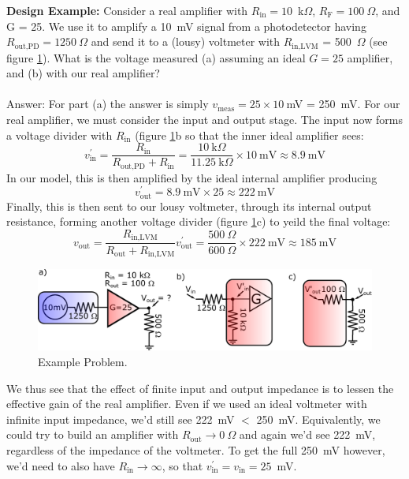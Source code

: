 \documentclass[]{article}
\begin{document}
\noindent\textbf{Design Example:} Consider a real amplifier with $R_\text{in} = 10$~k$\Omega$, $R_\text{F} = 100~\Omega$, and G = 25. We use it to amplify a 10~mV signal from a photodetector having $R_\text{out,PD} = 1250~\Omega$ and send it to a (lousy) voltmeter with $R_\text{in,LVM}$ = 500~$\Omega$ (see figure \ref{fig:prob_amp}). What is the voltage measured (a) assuming an ideal $G = 25$ amplifier, and (b) with our real amplifier?\\\\\noindent Answer: For part (a) the answer is simply $v_\text{meas} = 25\times10~$mV = 250~mV. For our real amplifier, we must consider the input and output stage. The input now forms a voltage divider with $R_\text{in}$ (figure \ref{fig:prob_amp}b so that the inner ideal amplifier sees:
$$
v_\text{in}^\prime=\frac{R_\text{in}}{R_\text{out,PD} + R_\text{in}} = \frac{10~\text{k}\Omega}{11.25~\text{k}\Omega}\times10~\text{mV} \approx 8.9~\text{mV}
$$
In our model, this is then amplified by the ideal internal amplifier producing
$$
v_\text{out}^\prime = 8.9~\text{mV}\times 25 \approx 222~\text{mV}
$$
Finally, this is then sent to our lousy voltmeter, through its internal output resistance, forming another voltage divider (figure \ref{fig:prob_amp}c) to yeild the final voltage:
$$
v_\text{out} = \frac{R_\text{in,LVM}}{R_\text{out} + R_\text{in,LVM}}v_\text{out}^\prime = \frac{500~\Omega}{600~\Omega}\times 222~\text{mV}\approx 185~\text{mV}
$$

\begin{figure}[ht]
\caption{Example Problem.}
\label{fig:prob_amp}
\begin{center}
\includegraphics[width=\textwidth]{Images/amp_example.pdf}
\end{center}
\end{figure}

We thus see that the effect of finite input and output impedance is to lessen the effective gain of the real amplifier. Even if we used an ideal voltmeter with infinite input impedance, we'd still see 222~mV $<$ 250~mV. Equivalently, we could try to build an amplifier with $R_\text{out} \rightarrow 0~\Omega$ and again we'd see 222~mV, regardless of the impedance of the voltmeter. To get the full 250~mV however, we'd need to also have $R_\text{in} \rightarrow \infty$, so that $v_\text{in}^\prime = v_\text{in} = 25$~mV. 
\end{document}
